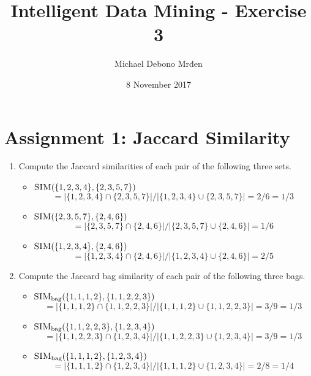 \documentclass{article}
\title{Intelligent Data Mining - Exercise 3}
\author{\fontencoding{T1}\selectfont Michael Debono Mrđen}
\date{8 November 2017}
\begin{document}
\maketitle

\section{Assignment 1: Jaccard Similarity}
\renewcommand{\labelenumi}{\alph{enumi}.}
\renewcommand{\labelenumii}{(\alph{enumii})}

\begin{enumerate}
\item{Compute the Jaccard similarities of each pair of the following three sets.
	\begin{itemize}
		\item{$\textsc{SIM} (\{1,2,3,4\}, \{2,3,5,7\})$
		    \[ = |\{1,2,3,4\} \cap \{2,3,5,7\}| / |\{1,2,3,4\} \cup \{2,3,5,7\}| = 2/6 = 1/3 \]}
		\item{$\textsc{SIM} (\{2,3,5,7\}, \{2,4,6\})$
			\[ = |\{2,3,5,7\} \cap \{2,4,6\}| / |\{2,3,5,7\} \cup \{2,4,6\}| = 1/6 \]}
		\item{$\textsc{SIM}(\{1,2,3,4\}, \{2,4,6\})$
			\[ = |\{1,2,3,4\} \cap \{2,4,6\}| / |\{1,2,3,4\} \cup \{2,4,6\}| = 2/5 \]}
	\end{itemize}
}
\item{Compute the Jaccard bag similarity of each pair of the following three bags.
	\begin{itemize}
		\item{$\textsc{SIM}_{\text{bag}} (\{1,1,1,2\}, \{1,1,2,2,3\})$
			\[ = |\{1,1,1,2\} \cap \{1,1,2,2,3\}| / |\{1,1,1,2\} \cup \{1,1,2,2,3\}| = 3/9 = 1/3 \]}
		\item{$\textsc{SIM}_{\text{bag}} (\{1,1,2,2,3\}, \{1,2,3,4\})$
			\[ = |\{1,1,2,2,3\} \cap \{1,2,3,4\}| / |\{1,1,2,2,3\} \cup \{1,2,3,4\}| = 3/9 = 1/3 \]}
		\item{$\textsc{SIM}_{\text{bag}} (\{1,1,1,2\}, \{1,2,3,4\})$
			\[ = |\{1,1,1,2\} \cap \{1,2,3,4\}| / |\{1,1,1,2\} \cup \{1,2,3,4\}| = 2/8 = 1/4 \]}
	\end{itemize}
}
\end{enumerate}
\end{document}
